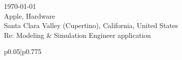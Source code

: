 \documentclass[12pt]{article} %
\begin{document}
\begin{paracol}{2} %


\parbox[top][0.1\textheight][c]{\linewidth}{ %
	\vspace{0.0\textheight} %
	\today\\[6pt]
	Apple, Hardware\\
	Santa Clara Valley (Cupertino), California, United States\\
	Re: Modeling \& Simulation Engineer application\\[6pt] \medskip
}


\switchcolumn %


\parbox[top][0.1\textheight][c]{\linewidth}{ %
	\vspace{0\textheight} %
	\colorbox{shade}{ %
		\begin{supertabular}{p{0.05\linewidth}|p{0.775\linewidth}} %
			\ifthenelse{\equal{\cvdate}{}}{}{\raisebox{-1pt}{\faInfo} & \cvdate \\}
			\ifthenelse{\equal{\cvaddress}{}}{}{\raisebox{-1pt}{\faHome} & \cvaddress \\} %
			\ifthenelse{\equal{\cvaddress}{}}{}{\raisebox{-1pt}{\faPhone} & \cvnumberphone \\} %
		\end{supertabular}
	}
}


\end{paracol}
\end{document}
